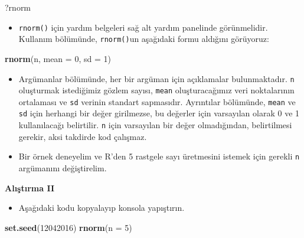 \documentclass[
  oneside]{book}
\newenvironment{Shaded}{\begin{snugshade}}{\end{snugshade}}
\newcommand{\AttributeTok}[1]{\textcolor[rgb]{0.13,0.29,0.53}{#1}}
\newcommand{\DecValTok}[1]{\textcolor[rgb]{0.00,0.00,0.81}{#1}}
\newcommand{\FunctionTok}[1]{\textcolor[rgb]{0.13,0.29,0.53}{\textbf{#1}}}
\newcommand{\NormalTok}[1]{#1}
\providecommand{\tightlist}{%
  \setlength{\itemsep}{0pt}\setlength{\parskip}{0pt}}
\begin{document}
\begin{Shaded}
\begin{Highlighting}[]
\NormalTok{?rnorm}
\end{Highlighting}
\end{Shaded}

\begin{itemize}
\tightlist
\item
  \texttt{rnorm()} için yardım belgeleri sağ alt yardım panelinde görünmelidir. Kullanım bölümünde, \texttt{rnorm()}un aşağıdaki formu aldığını görüyoruz:
\end{itemize}

\begin{Shaded}
\begin{Highlighting}[]
\FunctionTok{rnorm}\NormalTok{(n, }\AttributeTok{mean =} \DecValTok{0}\NormalTok{, }\AttributeTok{sd =} \DecValTok{1}\NormalTok{)}
\end{Highlighting}
\end{Shaded}

\begin{itemize}
\item
  Argümanlar bölümünde, her bir argüman için açıklamalar bulunmaktadır. \texttt{n} oluşturmak istediğimiz gözlem sayısı, \texttt{mean} oluşturacağımız veri noktalarının ortalaması ve \texttt{sd} verinin standart sapmasıdır. Ayrıntılar bölümünde, \texttt{mean} ve \texttt{sd} için herhangi bir değer girilmezse, bu değerler için varsayılan olarak 0 ve 1 kullanılacağı belirtilir. \texttt{n} için varsayılan bir değer olmadığından, belirtilmesi gerekir, aksi takdirde kod çalışmaz.
\item
  Bir örnek deneyelim ve R'den 5 rastgele sayı üretmesini istemek için gerekli \texttt{n} argümanını değiştirelim.
\end{itemize}

\textbf{Alıştırma II}

\begin{itemize}
\tightlist
\item
  Aşağıdaki kodu kopyalayıp konsola yapıştırın.
\end{itemize}

\begin{Shaded}
\begin{Highlighting}[]
\FunctionTok{set.seed}\NormalTok{(}\DecValTok{12042016}\NormalTok{)}
\FunctionTok{rnorm}\NormalTok{(}\AttributeTok{n =} \DecValTok{5}\NormalTok{)}
\end{Highlighting}
\end{Shaded}
\end{document}
